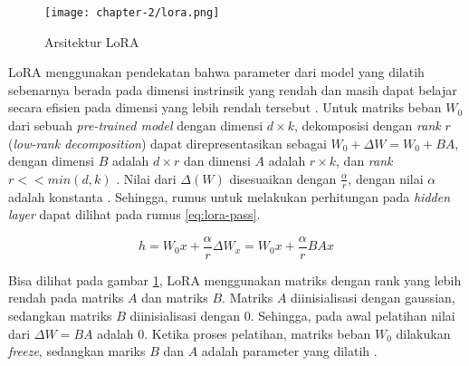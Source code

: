 \begin{figure}[h]
    \vspace{0.25cm}
    \centering
    \texttt{[image: chapter-2/lora.png]}
    \caption{Arsitektur LoRA \parencite{lora}}
    \label{fig:lora_arch}
\end{figure}

LoRA menggunakan pendekatan bahwa parameter dari model yang dilatih sebenarnya berada pada dimensi instrinsik yang rendah dan masih dapat belajar secara efisien pada dimensi yang lebih rendah tersebut \parencite{lora}. Untuk matriks beban $W_0$ dari sebuah \textit{pre-trained model} dengan dimensi $d\times{k}$, dekomposisi dengan \textit{rank} $r$ (\textit{low-rank decomposition}) dapat direpresentasikan sebagai $W_0 + \Delta{W} = W_0 + BA$, dengan dimensi $B$ adalah $d\times{r}$ dan dimensi $A$ adalah $r\times{k}$, dan \textit{rank} $r << min(d,k)$ \parencite{lora}. Nilai dari $\Delta(W)$ disesuaikan dengan $\frac{\alpha}{r}$, dengan nilai $\alpha$ adalah konstanta \parencite{lora}. Sehingga, rumus untuk melakukan perhitungan pada \textit{hidden layer} dapat dilihat pada rumus \ref{eq:lora-pass}.

\begin{equation}
    h = W_{0}x + \frac{\alpha}{r}\Delta{W_x} = W_{0}x + \frac{\alpha}{r}BAx
    \label{eq:lora-pass}
\end{equation}

Bisa dilihat pada gambar \ref{fig:lora_arch}, LoRA menggunakan matriks dengan rank yang lebih rendah pada matriks $A$ dan matriks $B$. Matriks $A$ diinisialisasi dengan gaussian, sedangkan matriks $B$ diinisialisasi dengan 0. Sehingga, pada awal pelatihan nilai dari $\Delta{W}=BA$ adalah 0. Ketika proses pelatihan, matriks beban $W_0$ dilakukan \textit{freeze}, sedangkan mariks $B$ dan $A$ adalah parameter yang dilatih \parencite{lora}.

